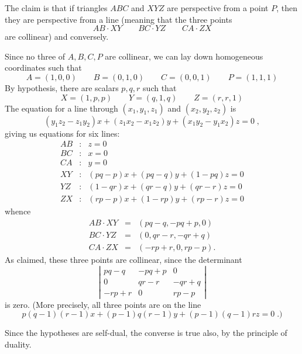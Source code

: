 \documentclass[12pt]{article}
\begin{document}
The claim is that if triangles $ABC$ and $XYZ$ are perspective from
a point $P$, then they are perspective from a line (meaning that
the three points
$$AB\cdot XY\qquad BC\cdot YZ\qquad CA\cdot ZX$$
are collinear) and conversely.

Since no three of $A,B,C,P$ are collinear, we can lay down
homogeneous coordinates such that
$$A=(1,0,0)\qquad B=(0,1,0)\qquad C=(0,0,1)\qquad P=(1,1,1)$$
By hypothesis, there are scalars $p,q,r$ such that
$$X=(1,p,p)\qquad Y=(q,1,q)\qquad Z=(r,r,1)$$
The equation for a line through $(x_1,y_1,z_1)$ and
$(x_2,y_2,z_2)$ is
$$(y_1z_2-z_1y_2)x+(z_1x_2-x_1z_2)y+(x_1y_2-y_1x_2)z=0\;,$$
giving us equations for six lines:
\begin{eqnarray*}
AB&:&z=0 \\ BC&:&x=0 \\ CA&:&y=0 \\
XY&:&(pq-p)x+(pq-q)y+(1-pq)z=0 \\
YZ&:&(1-qr)x+(qr-q)y+(qr-r)z=0 \\
ZX&:&(rp-p)x+(1-rp)y+(rp-r)z=0
\end{eqnarray*}
whence
\begin{eqnarray*}
AB\cdot XY&=&(pq-q,-pq+p,0)\\
BC\cdot YZ&=&(0,qr-r,-qr+q)\\
CA\cdot ZX&=&(-rp+r,0,rp-p).
\end{eqnarray*}
As claimed, these three points are collinear, since the
determinant
$$ \left| \begin{array}{ccc}
pq-q & -pq+p & 0 \\
0 & qr-r & -qr+q \\
-rp+r & 0 & rp-p
\end{array}\right| $$
is zero. (More precisely, all three points are on the line
$$p(q-1)(r-1)x+(p-1)q(r-1)y+(p-1)(q-1)rz=0\;.)$$

Since the hypotheses are self-dual, the converse is true also, by
the principle of duality.
\end{document}
